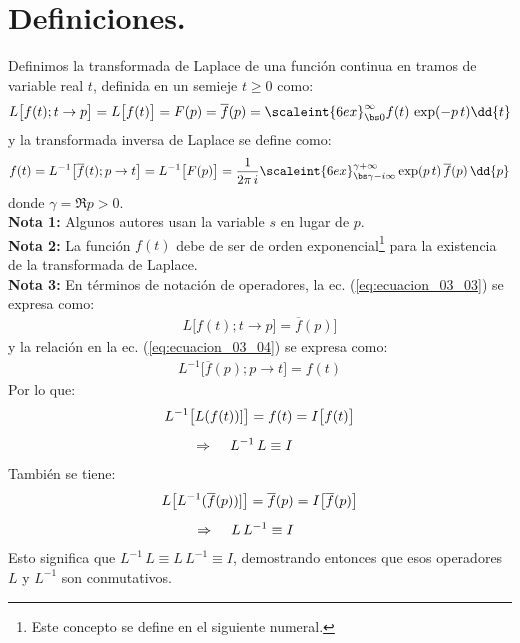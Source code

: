 \section{Definiciones.}

Definimos la transformada de Laplace de una función continua en tramos de variable real $t$, definida en un semieje $t \geq 0$ como:
\begin{align}
L \big[f(t); t \to p\big] = L \big[f(t)\big] = F(p) = \overline{f}(p) = \scaleint{6ex}_{\bs 0}^{\infty} f(t) \, \exp(-p \, t) \dd{t}
\label{eq:ecuacion_03_03}
\end{align}
y la transformada inversa de Laplace se define como:
\begin{align}
f(t) = L^{-1} \big[\overline{f}(t); p \to t\big] = L^{-1} \big[F(p)\big] = \dfrac{1}{2 \pi \, i} \scaleint{6ex}_{\bs \gamma-i \infty}^{\gamma+\infty} \exp(p \, t) \, \overline{f} (p) \, \dd{p}
\label{eq:ecuacion_03_04}
\end{align}
donde $\gamma = \Re{p} > 0$.
\\[1em]
\noindent \textbf{Nota 1: } Algunos autores usan la variable $s$ en lugar de $p$.
\\
\textbf{Nota 2: } La función $f(t)$ debe de ser de orden exponencial\footnote{Este concepto se define en el siguiente numeral.} para la existencia de la transformada de Laplace.
\\
\textbf{Nota 3: } En términos de notación de operadores, la ec. (\ref{eq:ecuacion_03_03}) se expresa como:
\begin{align}
L \big[ f(t); t \to p] = \overline{f} (p) \big]
\label{eq:ecuacion_03_05}
\end{align}
y la relación en la ec. (\ref{eq:ecuacion_03_04}) se expresa como:
\begin{align}
L^{-1} \big[\overline{f}(p); p \to t \big] = f (t)
\label{eq:ecuacion_03_06}
\end{align}
Por lo que:
\begin{align*}
L^{-1} \big[L(f(t))]\big] = f(t) &= I \big[f(t)\big] \\[0.5em]
\Rightarrow \hspace{0.4cm} L^{-1} \, L \equiv I
\end{align*}
También se tiene:
\begin{align*}
L \big[L^{-1} (\overline{f}(p))]\big] = \overline{f}(p) &= I \big[\overline{f}(p)\big] \\[0.5em]
\Rightarrow \hspace{0.4cm} L \, L^{-1} \equiv I
\end{align*}
Esto significa que $L^{-1} \, L \equiv L \, L^{-1} \equiv I$, demostrando entonces que esos operadores $L$ y $L^{-1}$ son conmutativos.

